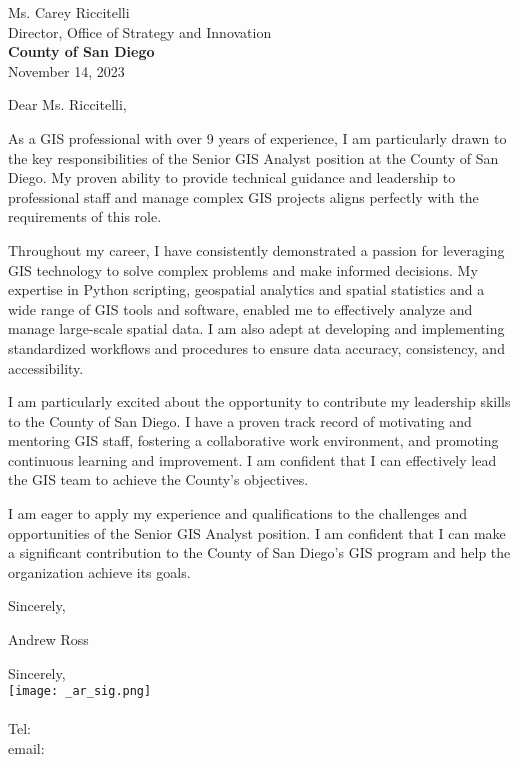 \documentclass[letterpaper]{article}
\begin{document}
\large
Ms. Carey Riccitelli \\
Director, Office of Strategy and Innovation \\
\textbf{County of San Diego} \\

\null\hfill November 14, 2023

Dear Ms. Riccitelli,

As a GIS professional with over 9 years of experience, I am
particularly drawn to the key responsibilities of the Senior GIS Analyst
position at the County of San Diego. My proven ability to provide technical
guidance and leadership to professional staff and manage complex GIS projects
aligns perfectly with the requirements of this
role.

Throughout my career, I have consistently demonstrated a passion for leveraging
GIS technology to solve complex problems and make informed decisions. My
expertise in Python scripting, geospatial analytics and spatial statistics and a wide
range of GIS tools and software,
enabled me to effectively analyze and manage large-scale spatial data. I am
also adept at developing and implementing standardized workflows and procedures
to ensure data accuracy, consistency, and accessibility.

I am particularly excited about the opportunity to contribute my leadership
skills to the County of San Diego. I have a proven track record of motivating
and mentoring GIS staff, fostering a collaborative work environment, and
promoting continuous learning and improvement. I am confident that I can
effectively lead the GIS team to achieve the County's objectives.

I am eager to apply my experience and qualifications to the challenges and
opportunities of the Senior GIS Analyst position. I am confident that I can
make a significant contribution to the County of San Diego's GIS program and
help the organization achieve its goals.

Sincerely,


Andrew Ross

Sincerely,\\
    \hspace{1em}
    \texttt{[image: \_ar\_sig.png]} \\
    \CVsigname \\
    \small
    Tel: \CVphone \\
    email: \CVemail
\end{document}
